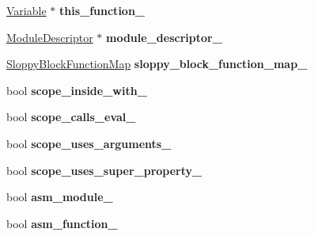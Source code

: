\begin{DoxyCompactItemize}
\item 
\hyperlink{classv8_1_1internal_1_1_variable}{Variable} $\ast$ {\bfseries this\+\_\+function\+\_\+}\hypertarget{classv8_1_1internal_1_1_scope_a11eb61393f06b711bf77afbe4962c42f}{}\label{classv8_1_1internal_1_1_scope_a11eb61393f06b711bf77afbe4962c42f}

\item 
\hyperlink{classv8_1_1internal_1_1_module_descriptor}{Module\+Descriptor} $\ast$ {\bfseries module\+\_\+descriptor\+\_\+}\hypertarget{classv8_1_1internal_1_1_scope_a5e4c9a23172c354a5557e9724365f78c}{}\label{classv8_1_1internal_1_1_scope_a5e4c9a23172c354a5557e9724365f78c}

\item 
\hyperlink{classv8_1_1internal_1_1_sloppy_block_function_map}{Sloppy\+Block\+Function\+Map} {\bfseries sloppy\+\_\+block\+\_\+function\+\_\+map\+\_\+}\hypertarget{classv8_1_1internal_1_1_scope_ab96624287cf0d79a7493154bea06c0b9}{}\label{classv8_1_1internal_1_1_scope_ab96624287cf0d79a7493154bea06c0b9}

\item 
bool {\bfseries scope\+\_\+inside\+\_\+with\+\_\+}\hypertarget{classv8_1_1internal_1_1_scope_a6201c5804752ef136e470df0c79b8b30}{}\label{classv8_1_1internal_1_1_scope_a6201c5804752ef136e470df0c79b8b30}

\item 
bool {\bfseries scope\+\_\+calls\+\_\+eval\+\_\+}\hypertarget{classv8_1_1internal_1_1_scope_a4541ec4968037e4663d09c3d877b9f8d}{}\label{classv8_1_1internal_1_1_scope_a4541ec4968037e4663d09c3d877b9f8d}

\item 
bool {\bfseries scope\+\_\+uses\+\_\+arguments\+\_\+}\hypertarget{classv8_1_1internal_1_1_scope_aeda9ca35103a6f43fde9551c11bdd6d3}{}\label{classv8_1_1internal_1_1_scope_aeda9ca35103a6f43fde9551c11bdd6d3}

\item 
bool {\bfseries scope\+\_\+uses\+\_\+super\+\_\+property\+\_\+}\hypertarget{classv8_1_1internal_1_1_scope_ab6d8addb59455a9e78cc69765db0a095}{}\label{classv8_1_1internal_1_1_scope_ab6d8addb59455a9e78cc69765db0a095}

\item 
bool {\bfseries asm\+\_\+module\+\_\+}\hypertarget{classv8_1_1internal_1_1_scope_a4b34f2b8019a3ff88f82b589de48598b}{}\label{classv8_1_1internal_1_1_scope_a4b34f2b8019a3ff88f82b589de48598b}

\item 
bool {\bfseries asm\+\_\+function\+\_\+}\hypertarget{classv8_1_1internal_1_1_scope_aba97b51b4f9db0ada77d1784a5faedb9}{}\label{classv8_1_1internal_1_1_scope_aba97b51b4f9db0ada77d1784a5faedb9}


\end{DoxyCompactItemize}
